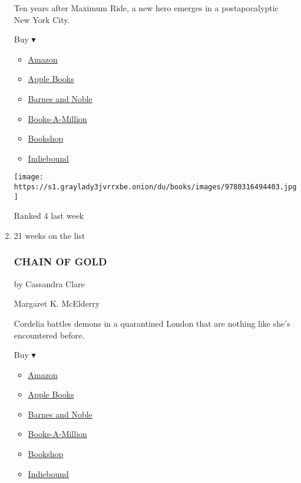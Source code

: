 \begin{enumerate}
  Ten years after Maximum Ride, a new hero emerges in a postapocalyptic
  New York City.

  Buy ▾

  \begin{itemize}
  \tightlist
  \item
    \href{https://www.amazon.com/dp/0316494402?tag=NYTBSREV-20\&tag=NYTBS-20}{Amazon}
  \item
    \href{https://du-gae-books-dot-nyt-du-prd.appspot.com/buy?title=HAWK\&author=James+Patterson}{Apple
    Books}
  \item
    \href{https://www.anrdoezrs.net/click-7990613-11819508?url=https\%3A\%2F\%2Fwww.barnesandnoble.com\%2Fw\%2F\%3Fean\%3D9780316494403}{Barnes
    and Noble}
  \item
    \href{https://www.anrdoezrs.net/click-7990613-35140?url=https\%3A\%2F\%2Fwww.booksamillion.com\%2Fp\%2FHAWK\%2FJames\%2BPatterson\%2F9780316494403}{Books-A-Million}
  \item
    \href{https://bookshop.org/a/3546/9780316494403}{Bookshop}
  \item
    \href{https://www.indiebound.org/book/9780316494403?aff=NYT}{Indiebound}
  \end{itemize}

  \texttt{[image: https://s1.graylady3jvrrxbe.onion/du/books/images/9780316494403.jpg]}

  Ranked 4 last week
\item
  21 weeks on the list

  \hypertarget{chain-of-gold}{%
  \subsubsection{CHAIN OF GOLD}\label{chain-of-gold}}

  by Cassandra Clare

  Margaret K. McElderry

  Cordelia battles demons in a quarantined London that are nothing like
  she's encountered before.

  Buy ▾

  \begin{itemize}
  \tightlist
  \item
    \href{https://www.amazon.com/dp/1481431870?tag=NYTBSREV-20\&tag=NYTBS-20}{Amazon}
  \item
    \href{https://du-gae-books-dot-nyt-du-prd.appspot.com/buy?title=CHAIN+OF+GOLD\&author=Cassandra+Clare}{Apple
    Books}
  \item
    \href{https://www.anrdoezrs.net/click-7990613-11819508?url=https\%3A\%2F\%2Fwww.barnesandnoble.com\%2Fw\%2F\%3Fean\%3D9781481431873}{Barnes
    and Noble}
  \item
    \href{https://www.anrdoezrs.net/click-7990613-35140?url=https\%3A\%2F\%2Fwww.booksamillion.com\%2Fp\%2FCHAIN\%2BOF\%2BGOLD\%2FCassandra\%2BClare\%2F9781481431873}{Books-A-Million}
  \item
    \href{https://bookshop.org/a/3546/9781481431873}{Bookshop}
  \item
    \href{https://www.indiebound.org/book/9781481431873?aff=NYT}{Indiebound}
  \end{itemize}


\end{enumerate}
